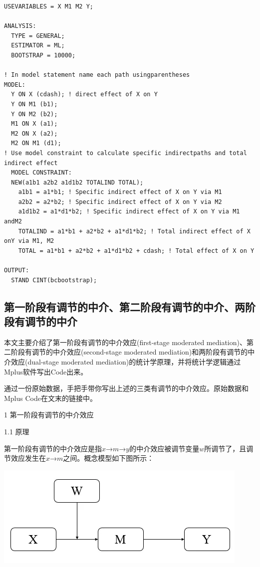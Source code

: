 \documentclass[
]{book}
\begin{document}
\begin{verbatim}
USEVARIABLES = X M1 M2 Y;

ANALYSIS:
  TYPE = GENERAL;
  ESTIMATOR = ML;
  BOOTSTRAP = 10000;

! In model statement name each path usingparentheses
MODEL:
  Y ON X (cdash); ! direct effect of X on Y
  Y ON M1 (b1);
  Y ON M2 (b2);
  M1 ON X (a1);
  M2 ON X (a2);
  M2 ON M1 (d1);
! Use model constraint to calculate specific indirectpaths and total indirect effect
  MODEL CONSTRAINT:
  NEW(a1b1 a2b2 a1d1b2 TOTALIND TOTAL);
    a1b1 = a1*b1; ! Specific indirect effect of X on Y via M1
    a2b2 = a2*b2; ! Specific indirect effect of X on Y via M2
    a1d1b2 = a1*d1*b2; ! Specific indirect effect of X on Y via M1 andM2
    TOTALIND = a1*b1 + a2*b2 + a1*d1*b2; ! Total indirect effect of X onY via M1, M2
    TOTAL = a1*b1 + a2*b2 + a1*d1*b2 + cdash; ! Total effect of X on Y

OUTPUT:
  STAND CINT(bcbootstrap);
\end{verbatim}

\hypertarget{firstmome}{%
\subsection{第一阶段有调节的中介、第二阶段有调节的中介、两阶段有调节的中介}\label{firstmome}}

本文主要介绍了第一阶段有调节的中介效应(first-stage moderated mediation)、第二阶段有调节的中介效应(second-stage moderated mediation)和两阶段有调节的中介效应(dual-stage moderated mediation)的统计学原理，并将统计学逻辑通过Mplus软件写出Code出来。

通过一份原始数据，手把手带你写出上述的三类有调节的中介效应。原始数据和Mplus Code在文末的链接中。

1 第一阶段有调节的中介效应

1.1 原理

第一阶段有调节的中介效应是指\(x\)→\(m\)→\(y\)的中介效应被调节变量\(w\)所调节了，且调节效应发生在\(x\)→\(m\)之间。概念模型如下图所示：

\includegraphics{figs/1141.png}
\end{document}
